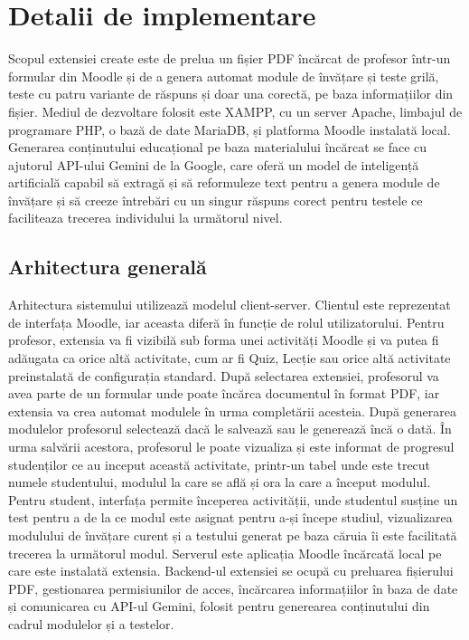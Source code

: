 \chapter{Detalii de implementare}

Scopul extensiei create este de prelua un fișier PDF încărcat de profesor într-un formular din Moodle și de a genera automat module de învățare și teste grilă, teste cu patru variante de
răspuns și doar una corectă, pe baza informațiilor din fișier. Mediul de dezvoltare folosit este XAMPP, cu un server Apache, limbajul de programare PHP, o bază de date MariaDB, și
platforma Moodle instalată local. Generarea conținutului educațional pe baza materialului încărcat se face cu ajutorul API-ului Gemini de la Google, care oferă un model de inteligență 
artificială capabil să extragă și să reformuleze text pentru a genera module de învățare și să creeze întrebări cu un singur răspuns corect pentru testele ce faciliteaza trecerea individului 
la următorul nivel.  

\section{Arhitectura generală}

Arhitectura sistemului utilizează modelul client-server. Clientul este reprezentat de interfața Moodle, iar aceasta diferă în funcție de rolul utilizatorului. Pentru profesor, extensia va 
fi vizibilă sub forma unei activități Moodle și va putea fi adăugata ca orice altă activitate, cum ar fi Quiz, Lecție sau orice altă activitate preinstalată de configurația standard. 
După selectarea extensiei, profesorul va avea parte de un formular unde poate încărca documentul în format PDF, iar extensia va crea automat modulele în urma completării acesteia. 
După generarea modulelor profesorul selectează dacă le salvează sau le generează încă o dată. În urma salvării acestora, profesorul le poate vizualiza și este informat de progresul studenților 
ce au inceput această activitate, printr-un tabel unde este trecut numele studentului, modulul la care se află și ora la care a început modulul. Pentru student, interfața permite începerea
activității, unde studentul susține un test pentru a de la ce modul este asignat pentru a-și începe studiul, vizualizarea modulului de învățare curent și a testului generat pe baza căruia 
îi este facilitată trecerea la următorul modul. Serverul este aplicația Moodle încărcată local pe care este instalată extensia. Backend-ul extensiei se ocupă cu preluarea 
fișierului PDF, gestionarea permisiunilor de acces, încărcarea informațiilor în baza de date și comunicarea cu API-ul Gemini, folosit pentru generearea conținutului din cadrul modulelor și 
a testelor.


